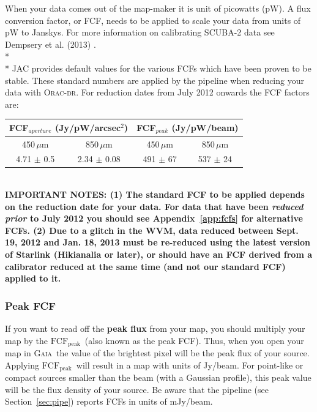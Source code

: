 \documentclass[twoside,11pt]{article}
\newcommand{\htmladdnormallink}[2]{#1}
\newcommand{\htmlref}[2]{#1}
\newcommand{\latexhtml}[2]{#1}
\newcommand{\xref}[3]{#1}
\renewcommand{\_}{\texttt{\symbol{95}}}
\newcommand{\fcfb}{$\mathrm{FCF_{peak}}$}
\newcommand{\gaia}{\xref{\textsc{Gaia}}{sun214}{}}
\newcommand{\oracdr}{\htmladdnormallink{\textsc{Orac-dr}}{http://www.oracdr.org/oracdr}}
\newcommand{\cref}[3]{\latexhtml{#1~\ref{#2}}{\htmlref{#3}{#2}}}
\begin{document}
When your data comes out of the map-maker it is unit of picowatts
(pW). A flux conversion factor, or FCF, needs to be applied to scale
your data from units of pW to Janskys. For more information on calibrating
SCUBA-2 data see Dempsery et al. (2013) \cite{dempsey12}.
\\*\\*
JAC provides default values for the various FCFs which have been proven
to be stable. These standard numbers are applied by the pipeline when
reducing your data with \oracdr. For reduction dates from July 2012
onwards the FCF factors are:
\begin{table}[h!]
\centering
\begin{tabular}{|c|c|c|c|}
\hline
\multicolumn{2}{|c|}{FCF$_{aperture}$ (Jy/pW/arcsec$^2$) } &
\multicolumn{2}{c|}{FCF$_{peak}$ (Jy/pW/beam)} \\
\hline
\hspace{0.4cm} 450\,$\mu$m \hspace{0.3cm} & 850\,$\mu$m & \hspace{0.4cm} 450\,$\mu$m \hspace{0.3cm}& 850\,$\mu$m \\
\hline
4.71 $\pm$ 0.5& 2.34 $\pm$ 0.08& 491 $\pm$ 67& 537 $\pm$ 24 \\
\hline
\end{tabular}
\end{table}
\\
\textbf{IMPORTANT NOTES: (1) The standard FCF to be applied depends on
the reduction date for your data. For data that have been
\emph{reduced prior} to July 2012 you should see
\cref{Appendix}{app:fcfs}{FCFs by Reduction Date} for alternative
FCFs. (2) Due to a glitch in the WVM, data reduced between Sept. 19,
2012 and Jan. 18, 2013 must be re-reduced using the latest version of
Starlink (Hikianalia or later), or should have an FCF derived from a
calibrator reduced at the same time (and not our standard FCF) applied
to it. }

\subsubsection{Peak FCF}

If you want to read off the \textbf{peak flux} from your map, you
should multiply your map by the \fcfb\ (also known as the peak FCF).
Thus, when you open your map in \gaia\ the value of the brightest
pixel will be the peak flux of your source. Applying \fcfb\ will
result in a map with units of Jy/beam. For point-like or compact
sources smaller than the beam (with a Gaussian profile), this peak
value will be the flux density of your source. Be aware that the
pipeline (see \cref{Section}{sec:pipe}{SCUBA-2 Pipeline}) reports FCFs
in units of mJy/beam.
\end{document}
